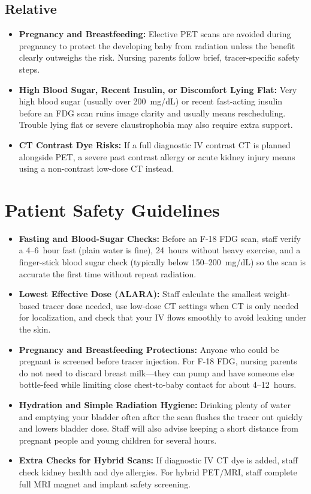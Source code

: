 \subsection{Relative}

\begin{itemize}
    \item \textbf{Pregnancy and Breastfeeding:} Elective PET scans are avoided during pregnancy to protect the developing baby from radiation unless the benefit clearly outweighs the risk. Nursing parents follow brief, tracer-specific safety steps.
    \item \textbf{High Blood Sugar, Recent Insulin, or Discomfort Lying Flat:} Very high blood sugar (usually over 200~mg/dL) or recent fast-acting insulin before an FDG scan ruins image clarity and usually means rescheduling. Trouble lying flat or severe claustrophobia may also require extra support.
    \item \textbf{CT Contrast Dye Risks:} If a full diagnostic IV contrast CT is planned alongside PET, a severe past contrast allergy or acute kidney injury means using a non-contrast low-dose CT instead.
\end{itemize}

\section{Patient Safety Guidelines}

\begin{itemize}
    \item \textbf{Fasting and Blood-Sugar Checks:} Before an F-18 FDG scan, staff verify a 4--6~hour fast (plain water is fine), 24~hours without heavy exercise, and a finger-stick blood sugar check (typically below 150--200~mg/dL) so the scan is accurate the first time without repeat radiation.
    \item \textbf{Lowest Effective Dose (ALARA):} Staff calculate the smallest weight-based tracer dose needed, use low-dose CT settings when CT is only needed for localization, and check that your IV flows smoothly to avoid leaking under the skin.
    \item \textbf{Pregnancy and Breastfeeding Protections:} Anyone who could be pregnant is screened before tracer injection. For F-18 FDG, nursing parents do not need to discard breast milk---they can pump and have someone else bottle-feed while limiting close chest-to-baby contact for about 4--12~hours.
    \item \textbf{Hydration and Simple Radiation Hygiene:} Drinking plenty of water and emptying your bladder often after the scan flushes the tracer out quickly and lowers bladder dose. Staff will also advise keeping a short distance from pregnant people and young children for several hours.
    \item \textbf{Extra Checks for Hybrid Scans:} If diagnostic IV CT dye is added, staff check kidney health and dye allergies. For hybrid PET/MRI, staff complete full MRI magnet and implant safety screening.
\end{itemize}

